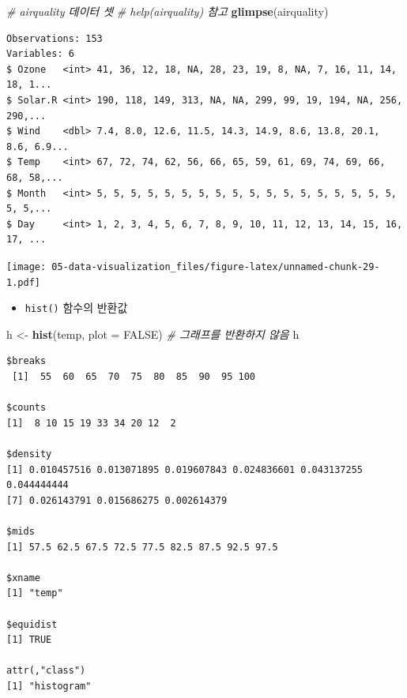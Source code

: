 \documentclass[
  11pt,
]{krantz}
\newenvironment{Shaded}{\begin{snugshade}}{\end{snugshade}}
\newcommand{\CommentTok}[1]{\textcolor[rgb]{0.37,0.37,0.37}{\textit{#1}}}
\newcommand{\DataTypeTok}[1]{\textcolor[rgb]{0.27,0.27,0.27}{#1}}
\newcommand{\KeywordTok}[1]{\textcolor[rgb]{0.27,0.27,0.27}{\textbf{#1}}}
\newcommand{\NormalTok}[1]{#1}
\newcommand{\OperatorTok}[1]{\textcolor[rgb]{0.43,0.43,0.43}{\textbf{#1}}}
\newcommand{\OtherTok}[1]{\textcolor[rgb]{0.37,0.37,0.37}{#1}}
\newcommand{\StringTok}[1]{\textcolor[rgb]{0.5,0.5,0.5}{#1}}
\providecommand{\tightlist}{%
  \setlength{\itemsep}{0pt}\setlength{\parskip}{0pt}}
\begin{document}
\normalsize

\footnotesize

\begin{Shaded}
\begin{Highlighting}[]
\CommentTok{# airquality 데이터 셋}
\CommentTok{# help(airquality) 참고}
\KeywordTok{glimpse}\NormalTok{(airquality)}
\end{Highlighting}
\end{Shaded}

\begin{verbatim}
Observations: 153
Variables: 6
$ Ozone   <int> 41, 36, 12, 18, NA, 28, 23, 19, 8, NA, 7, 16, 11, 14, 18, 1...
$ Solar.R <int> 190, 118, 149, 313, NA, NA, 299, 99, 19, 194, NA, 256, 290,...
$ Wind    <dbl> 7.4, 8.0, 12.6, 11.5, 14.3, 14.9, 8.6, 13.8, 20.1, 8.6, 6.9...
$ Temp    <int> 67, 72, 74, 62, 56, 66, 65, 59, 61, 69, 74, 69, 66, 68, 58,...
$ Month   <int> 5, 5, 5, 5, 5, 5, 5, 5, 5, 5, 5, 5, 5, 5, 5, 5, 5, 5, 5, 5,...
$ Day     <int> 1, 2, 3, 4, 5, 6, 7, 8, 9, 10, 11, 12, 13, 14, 15, 16, 17, ...
\end{verbatim}

\begin{Shaded}
\end{Shaded}

\texttt{[image: 05-data-visualization\_files/figure-latex/unnamed-chunk-29-1.pdf]}

\normalsize

\begin{itemize}
\tightlist
\item
  \texttt{hist()} 함수의 반환값
\end{itemize}

\footnotesize

\begin{Shaded}
\begin{Highlighting}[]
\NormalTok{h <-}\StringTok{ }\KeywordTok{hist}\NormalTok{(temp, }\DataTypeTok{plot =} \OtherTok{FALSE}\NormalTok{) }\CommentTok{# 그래프를 반환하지 않음}
\NormalTok{h}
\end{Highlighting}
\end{Shaded}

\begin{verbatim}
$breaks
 [1]  55  60  65  70  75  80  85  90  95 100

$counts
[1]  8 10 15 19 33 34 20 12  2

$density
[1] 0.010457516 0.013071895 0.019607843 0.024836601 0.043137255 0.044444444
[7] 0.026143791 0.015686275 0.002614379

$mids
[1] 57.5 62.5 67.5 72.5 77.5 82.5 87.5 92.5 97.5

$xname
[1] "temp"

$equidist
[1] TRUE

attr(,"class")
[1] "histogram"
\end{verbatim}
\end{document}
